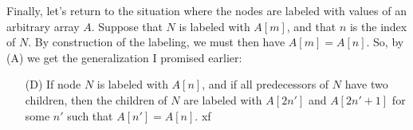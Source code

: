 \documentclass[
]{article}
\begin{document}
Finally, let's return to the situation where the nodes are labeled with values of an arbitrary array $A$. Suppose that $N$ is labeled with $A[m]$, and that $n$ is the index of $N$.  By construction of the labeling, we must then have $A[m]=A[n]$.
So, by (A) we get the generalization I promised earlier:
\begin{itemize}
\item[(D)] If node $N$ is labeled with $A[n]$, and if all predecessors of $N$ have two children, then the children of $N$ are labeled with $A[2n']$ and $A[2n'+1]$ for some $n'$ such that $A[n']=A[n]$.
xf\end{itemize}
\end{document}
